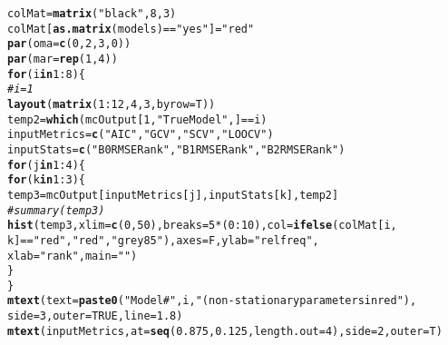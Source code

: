 \documentclass{article}\usepackage[]{graphicx}\usepackage[]{color}
\makeatletter
\newcommand{\hlnum}[1]{\textcolor[rgb]{0.686,0.059,0.569}{#1}}%
\newcommand{\hlstr}[1]{\textcolor[rgb]{0.192,0.494,0.8}{#1}}%
\newcommand{\hlcom}[1]{\textcolor[rgb]{0.678,0.584,0.686}{\textit{#1}}}%
\newcommand{\hlopt}[1]{\textcolor[rgb]{0,0,0}{#1}}%
\newcommand{\hlstd}[1]{\textcolor[rgb]{0.345,0.345,0.345}{#1}}%
\newcommand{\hlkwa}[1]{\textcolor[rgb]{0.161,0.373,0.58}{\textbf{#1}}}%
\newcommand{\hlkwb}[1]{\textcolor[rgb]{0.69,0.353,0.396}{#1}}%
\newcommand{\hlkwc}[1]{\textcolor[rgb]{0.333,0.667,0.333}{#1}}%
\newcommand{\hlkwd}[1]{\textcolor[rgb]{0.737,0.353,0.396}{\textbf{#1}}}%
\newenvironment{kframe}{%
 \def\at@end@of@kframe{}%
 \ifinner\ifhmode%
  \def\at@end@of@kframe{\end{minipage}}%
  \begin{minipage}{\columnwidth}%
 \fi\fi%
 \def\FrameCommand##1{\hskip\@totalleftmargin \hskip-\fboxsep
 \colorbox{shadecolor}{##1}\hskip-\fboxsep
     \hskip-\linewidth \hskip-\@totalleftmargin \hskip\columnwidth}%
 \MakeFramed {\advance\hsize-\width
   \@totalleftmargin\z@ \linewidth\hsize
   \@setminipage}}%
 {\par\unskip\endMakeFramed%
 \at@end@of@kframe}
\newenvironment{knitrout}{}{} %
\makeatother
\begin{document}
\begin{knitrout}
\color{fgcolor}\begin{kframe}
\begin{alltt}
\hlstd{colMat} \hlkwb{=} \hlkwd{matrix}\hlstd{(}\hlstr{"black"}\hlstd{,} \hlnum{8}\hlstd{,} \hlnum{3}\hlstd{)}
\hlstd{colMat[}\hlkwd{as.matrix}\hlstd{(models)} \hlopt{==} \hlstr{"yes"}\hlstd{]} \hlkwb{=} \hlstr{"red"}
\hlkwd{par}\hlstd{(}\hlkwc{oma} \hlstd{=} \hlkwd{c}\hlstd{(}\hlnum{0}\hlstd{,} \hlnum{2}\hlstd{,} \hlnum{3}\hlstd{,} \hlnum{0}\hlstd{))}
\hlkwd{par}\hlstd{(}\hlkwc{mar} \hlstd{=} \hlkwd{rep}\hlstd{(}\hlnum{1}\hlstd{,} \hlnum{4}\hlstd{))}
\hlkwa{for} \hlstd{(i} \hlkwa{in} \hlnum{1}\hlopt{:}\hlnum{8}\hlstd{) \{}
    \hlcom{# i = 1}
    \hlkwd{layout}\hlstd{(}\hlkwd{matrix}\hlstd{(}\hlnum{1}\hlopt{:}\hlnum{12}\hlstd{,} \hlnum{4}\hlstd{,} \hlnum{3}\hlstd{,} \hlkwc{byrow} \hlstd{= T))}
    \hlstd{temp2} \hlkwb{=} \hlkwd{which}\hlstd{(mcOutput[}\hlnum{1}\hlstd{,} \hlstr{"True Model"}\hlstd{, ]} \hlopt{==} \hlstd{i)}
    \hlstd{inputMetrics} \hlkwb{=} \hlkwd{c}\hlstd{(}\hlstr{"AIC"}\hlstd{,} \hlstr{"GCV"}\hlstd{,} \hlstr{"SCV"}\hlstd{,} \hlstr{"LOOCV"}\hlstd{)}
    \hlstd{inputStats} \hlkwb{=} \hlkwd{c}\hlstd{(}\hlstr{"B0RMSE Rank"}\hlstd{,} \hlstr{"B1RMSE Rank"}\hlstd{,} \hlstr{"B2RMSE Rank"}\hlstd{)}
    \hlkwa{for} \hlstd{(j} \hlkwa{in} \hlnum{1}\hlopt{:}\hlnum{4}\hlstd{) \{}
        \hlkwa{for} \hlstd{(k} \hlkwa{in} \hlnum{1}\hlopt{:}\hlnum{3}\hlstd{) \{}
            \hlstd{temp3} \hlkwb{=} \hlstd{mcOutput[inputMetrics[j], inputStats[k], temp2]}
            \hlcom{# summary(temp3)}
            \hlkwd{hist}\hlstd{(temp3,} \hlkwc{xlim} \hlstd{=} \hlkwd{c}\hlstd{(}\hlnum{0}\hlstd{,} \hlnum{50}\hlstd{),} \hlkwc{breaks} \hlstd{=} \hlnum{5} \hlopt{*} \hlstd{(}\hlnum{0}\hlopt{:}\hlnum{10}\hlstd{),} \hlkwc{col} \hlstd{=} \hlkwd{ifelse}\hlstd{(colMat[i,}
                \hlstd{k]} \hlopt{==} \hlstr{"red"}\hlstd{,} \hlstr{"red"}\hlstd{,} \hlstr{"grey85"}\hlstd{),} \hlkwc{axes} \hlstd{= F,} \hlkwc{ylab} \hlstd{=} \hlstr{"rel freq"}\hlstd{,}
                \hlkwc{xlab} \hlstd{=} \hlstr{"rank"}\hlstd{,} \hlkwc{main} \hlstd{=} \hlstr{""}\hlstd{)}
        \hlstd{\}}
    \hlstd{\}}
    \hlkwd{mtext}\hlstd{(}\hlkwc{text} \hlstd{=} \hlkwd{paste0}\hlstd{(}\hlstr{"Model #"}\hlstd{, i,} \hlstr{"(non-stationary parameters in red"}\hlstd{),}
        \hlkwc{side} \hlstd{=} \hlnum{3}\hlstd{,} \hlkwc{outer} \hlstd{=} \hlnum{TRUE}\hlstd{,} \hlkwc{line} \hlstd{=} \hlnum{1.8}\hlstd{)}
    \hlkwd{mtext}\hlstd{(inputMetrics,} \hlkwc{at} \hlstd{=} \hlkwd{seq}\hlstd{(}\hlnum{0.875}\hlstd{,} \hlnum{0.125}\hlstd{,} \hlkwc{length.out} \hlstd{=} \hlnum{4}\hlstd{),} \hlkwc{side} \hlstd{=} \hlnum{2}\hlstd{,} \hlkwc{outer} \hlstd{= T)}

\end{alltt}
\end{kframe}
\end{knitrout}
\end{document}
